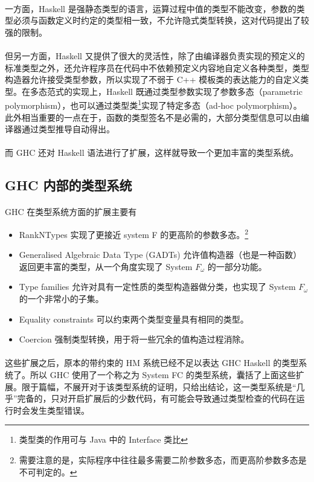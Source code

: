 \documentclass{article}
\begin{document}
	\paragraph{}
	一方面，Haskell 是强静态类型的语言，运算过程中值的类型不能改变，参数的类型必须与函数定义时约定的类型相一致，不允许隐式类型转换，这对代码提出了较强的限制。
	\paragraph{}
	但另一方面，Haskell 又提供了很大的灵活性，除了由编译器负责实现的预定义的标准类型之外，还允许程序员在代码中不依赖预定义内容地自定义各种类型，类型构造器允许接受类型参数，所以实现了不弱于 C++ 模板类的表达能力的自定义类型。在多态范式的实现上，Haskell 既通过类型参数实现了参数多态（parametric polymorphism），也可以通过类型类\footnote{类型类的作用可与 Java 中的 Interface 类比}实现了特定多态（ad-hoc polymorphism）。此外相当重要的一点在于，函数的类型签名不是必需的，大部分类型信息可以由编译器通过类型推导自动得出。
	\paragraph{}
	而 GHC 还对 Haskell 语法进行了扩展，这样就导致一个更加丰富的类型系统。
	\subsection{GHC 内部的类型系统}
	\paragraph{}
	GHC 在类型系统方面的扩展\cite{GHClangfeatures}主要有
	\begin{itemize}
		\item  RankNTypes 实现了更接近 system F 的更高阶的参数多态。\footnote{需要注意的是，实际程序中往往最多需要二阶参数多态，而更高阶参数多态是不可判定的。}
		\item Generalised Algebraic Data Type (GADTs) 允许值构造器（也是一种函数）返回更丰富的类型，从一个角度实现了 System $F_\omega$ 的一部分功能。
		\item Type families 允许对具有一定性质的类型构造器做分类，也实现了 System $F_\omega$ 的一个非常小的子集。
		\item Equality constraints 可以约束两个类型变量具有相同的类型。
		\item Coercion 强制类型转换，用于将一些冗余的值构造过程消除。
	\end{itemize}
	\paragraph{}
	这些扩展之后，原本的带约束的 HM 系统已经不足以表达 GHC Haskell 的类型系统了。所以 GHC 使用了一个称之为 System FC 的类型系统\cite{Sulzmann:2007:SFT:1190315.1190324}\cite{FCimpl}，囊括了上面这些扩展。限于篇幅，不展开对于该类型系统的证明，只给出结论，这一类型系统是“几乎”完备的，只对开启扩展后的少数代码，有可能会导致通过类型检查的代码在运行时会发生类型错误。
\end{document}
